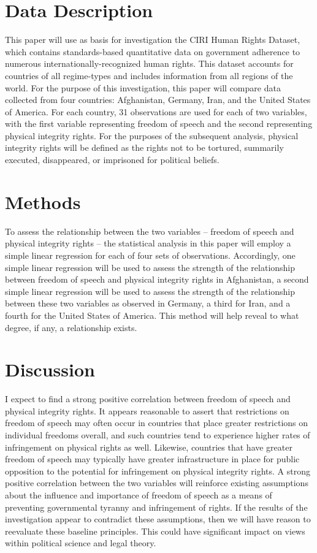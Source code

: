 \documentclass{article}
\begin{document}
\section{Data Description}
This paper will use as basis for investigation the CIRI Human Rights Dataset, which contains standards-based quantitative data on government adherence to numerous internationally-recognized human rights. This dataset accounts for countries of all regime-types and includes information from all regions of the world. For the purpose of this investigation, this paper will compare data collected from four countries: Afghanistan, Germany, Iran, and the United States of America. For each country, 31 observations are used for each of two variables, with the first variable representing freedom of speech and the second representing physical integrity rights. For the purposes of the subsequent analysis, physical integrity rights will be defined as the rights not to be tortured, summarily executed, disappeared, or imprisoned for political beliefs.

\section{Methods}
To assess the relationship between the two variables -- freedom of speech and physical integrity rights -- the statistical analysis in this paper will employ a simple linear regression for each of four sets of observations. Accordingly, one simple linear regression will be used to assess the strength of the relationship between freedom of speech and physical integrity rights in Afghanistan, a second simple linear regression will be used to assess the strength of the relationship between these two variables as observed in Germany, a third for Iran, and a fourth for the United States of America. This method will help reveal to what degree, if any, a relationship exists.


\section{Discussion}
I expect to find a strong positive correlation between freedom of speech and physical integrity rights. It appears reasonable to assert that restrictions on freedom of speech may often occur in countries that place greater restrictions on individual freedoms overall, and such countries tend to experience higher rates of infringement on physical rights as well. Likewise, countries that have greater freedom of speech may typically have greater infrastructure in place for public opposition to the potential for infringement on physical integrity rights. A strong positive correlation between the two variables will reinforce existing assumptions about the influence and importance of freedom of speech as a means of preventing governmental tyranny and infringement of rights. If the results of the investigation appear to contradict these assumptions, then we will have reason to reevaluate these baseline principles. This could have significant impact on views within political science and legal theory.
\end{document}

